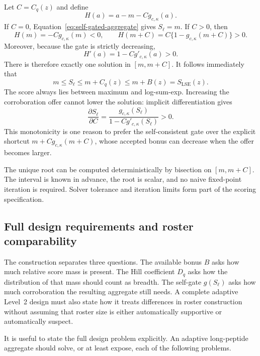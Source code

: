 \documentclass[11pt]{article}
\newcommand{\LSE}{\operatorname{LSE}}
\begin{document}
Let $C=C_q(z)$ and define
\begin{equation}
H(a)=a-m-Cg_{c,\kappa}(a).
\end{equation}
If $C=0$, Equation~\eqref{eq:self-gated-aggregate} gives $S_\ell=m$. If $C>0$,
then
\begin{equation}
H(m)=-Cg_{c,\kappa}(m)<0,
\qquad
H(m+C)=C\{1-g_{c,\kappa}(m+C)\}>0.
\end{equation}
Moreover, because the gate is strictly decreasing,
\begin{equation}
H'(a)=1-Cg'_{c,\kappa}(a)>0.
\end{equation}
There is therefore exactly one solution in $[m,m+C]$. It follows immediately
that
\begin{equation}
m
\leq
S_\ell
\leq
m+C_q(z)
\leq
m+B(z)
=
S_{\LSE}(z).
\label{eq:self-gated-bounds}
\end{equation}
The score always lies between maximum and log-sum-exp. Increasing the
corroboration offer cannot lower the solution: implicit differentiation gives
\begin{equation}
\frac{\partial S_\ell}{\partial C}
=
\frac{g_{c,\kappa}(S_\ell)}{1-Cg'_{c,\kappa}(S_\ell)}
>0.
\end{equation}
This monotonicity is one reason to prefer the self-consistent gate over the
explicit shortcut $m+Cg_{c,\kappa}(m+C)$, whose accepted bonus can decrease
when the offer becomes larger.

The unique root can be computed deterministically by bisection on $[m,m+C]$.
The interval is known in advance, the root is scalar, and no naive fixed-point
iteration is required. Solver tolerance and iteration limits form part of the
scoring specification.

\subsection{Full design requirements and roster comparability}

The construction separates three questions. The available bonus $B$ asks how
much relative score mass is present. The Hill coefficient $D_q$ asks how the
distribution of that mass should count as breadth. The self-gate $g(S_\ell)$ asks
how much corroboration the resulting aggregate still needs. A complete
adaptive Level~2 design must also state how it treats differences in roster
construction without assuming that roster size is either automatically
supportive or automatically suspect.

It is useful to state the full design problem explicitly. An adaptive
long-peptide aggregate should solve, or at least expose, each of the following
problems.
\end{document}
